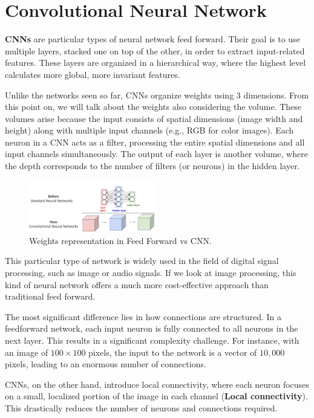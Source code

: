 \chapter{Convolutional Neural Network}
\textbf{CNNs} are particular types of neural network feed forward. Their goal
is to use multiple layers, stacked one on top of the other, in order to extract
input-related features. These layers are organized in a hierarchical way, where
the highest level calculates more global, more invariant features.

Unlike the networks seen so far, CNNs organize weights using 3 dimensions. From
this point on, we will talk about the weights also considering the volume. These
volumes arise because the input consists of spatial dimensions (image width and
height) along with multiple input channels (e.g., RGB for color images). Each
neuron in a CNN acts as a filter, processing the entire spatial dimensions and
all input channels simultaneously. The output of each layer is another volume,
where the depth corresponds to the number of filters (or neurons) in the hidden
layer.

\begin{figure}[!ht]
    \centering
    \includegraphics[width=0.5\textwidth]{img/CNN/weights.png}
    \caption{Weights representation in Feed Forward vs CNN.}
    \label{fig:weights}
\end{figure}

This particular type of network is widely used in the field of digital signal
processing, such as image or audio signals. If we look at image processing, this
kind of neural network offers a much more cost-effective approach than traditional
feed forward.

The most significant difference lies in how connections are structured. In a
feedforward network, each input neuron is fully connected to all neurons in the
next layer. This results in a significant complexity challenge. For instance,
with an image of $100 \times 100$ pixels, the input to the network is a vector
of $10,000$ pixels, leading to an enormous number of connections.

CNNs, on the other hand, introduce local connectivity, where each neuron focuses
on a small, localized portion of the image in each channel (\textbf{Local
    connectivity}). This drastically reduces the number of neurons and connections
required.

